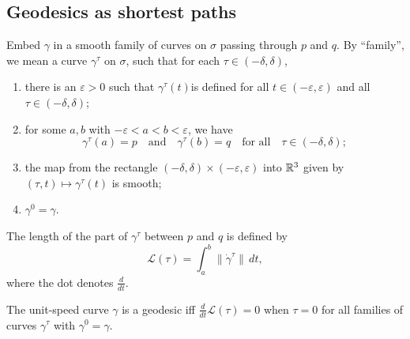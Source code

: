 \subsection{Geodesics as shortest paths}
Embed $\gamma $ in a smooth family of curves on $\sigma$ passing through $p$ and $q.$ By ``family'', we mean a curve $\gamma ^{\tau}$ on $\sigma$, such that for each $\tau \in (-\delta ,\delta )$, 
\begin{enumerate}[label=(\roman*)]
\setlength\itemsep{-.2em}
    \item there is an $\varepsilon >0$ such that $\gamma ^{\tau}(t)$is defined for all $t \in (-\varepsilon ,\varepsilon )$ and all $\tau \in (-\delta ,\delta )$;
    \item for some $a,b$ with $-\varepsilon  < a<  b < \varepsilon $, we have \[
            \gamma ^{\tau}(a)=p \quad \text{and} \quad \gamma ^{\tau}(b)=q\quad \text{for all} \quad \tau \in (-\delta ,\delta );
    \] 
\item the map from the rectangle $(-\delta ,\delta ) \times (-\varepsilon ,\varepsilon )$ into $\mathbb{R}^3$ given by $(\tau ,t) \mapsto  \gamma ^{\tau}(t)$ is smooth;
\item $\gamma ^{0}=\gamma $.
\end{enumerate}
The length of the part of $\gamma ^{\tau}$ between $p$ and $q$ is defined by \[
    \mathcal{L} (\tau)= \int_{a}^{b} \|\dot \gamma ^{\tau} \| \, dt,
\] where the dot denotes  $\frac{d}{dt}$.
\begin{theorem}
    The unit-speed curve $\gamma $ is a geodesic iff $\frac{d}{dt}\mathcal{L} (\tau)=0$ when $\tau=0$ for all families of curves $\gamma ^{\tau}$ with $\gamma ^0=\gamma $.
\end{theorem}
